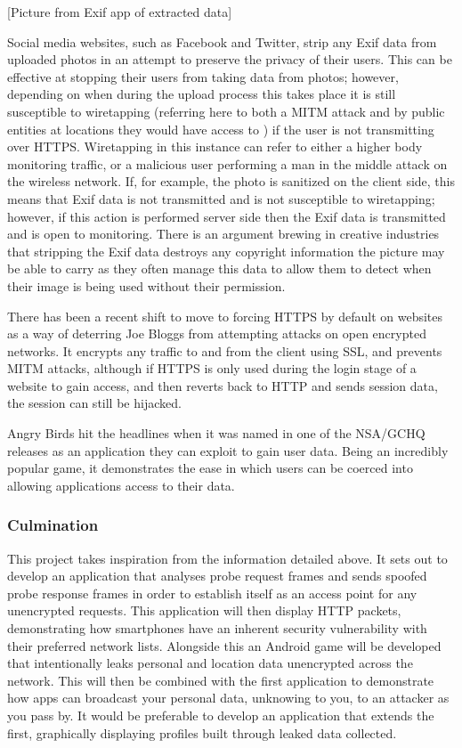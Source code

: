 [Picture from Exif app of extracted data]

Social media websites, such as Facebook and Twitter, strip any Exif data from uploaded photos in an attempt to preserve the privacy of their users. This can be effective at stopping their users from taking data from photos; however, depending on when during the upload process this takes place it is still susceptible to wiretapping (referring here to both a MITM attack and by public entities at locations they would have access to \cite{intro:room_641a}) if the user is not transmitting over HTTPS. Wiretapping in this instance can refer to either a higher body monitoring traffic, or a malicious user performing a man in the middle attack on the wireless network. If, for example, the photo is sanitized on the client side, this means that Exif data is not transmitted and is not susceptible to wiretapping; however, if this action is performed server side then the Exif data is transmitted and is open to monitoring. There is an argument brewing in creative industries that stripping the Exif data destroys any copyright information the picture may be able to carry as they often manage this data to allow them to detect when their image is being used without their permission.

There has been a recent shift to move to forcing HTTPS by default on websites as a way of deterring Joe Bloggs from attempting attacks on open encrypted networks. It encrypts any traffic to and from the client using SSL, and prevents MITM attacks, although if HTTPS is only used during the login stage of a website to gain access, and then reverts back to HTTP and sends session data, the session can still be hijacked.

Angry Birds hit the headlines when it was named in one of the NSA/GCHQ releases as an application they can exploit to gain user data. Being an incredibly popular game, it demonstrates the ease in which users can be coerced into allowing applications access to their data.

\subsubsection{Culmination}

This project takes inspiration from the information detailed above. It sets out to develop an application that analyses probe request frames and sends spoofed probe response frames in order to establish itself as an access point for any unencrypted requests. This application will then display HTTP packets, demonstrating how smartphones have an inherent security vulnerability with their preferred network lists. Alongside this an Android game will be developed that intentionally leaks personal and location data unencrypted across the network. This will then be combined with the first application to demonstrate how apps can broadcast your personal data, unknowing to you, to an attacker as you pass by. It would be preferable to develop an application that extends the first, graphically displaying profiles built through leaked data collected.

